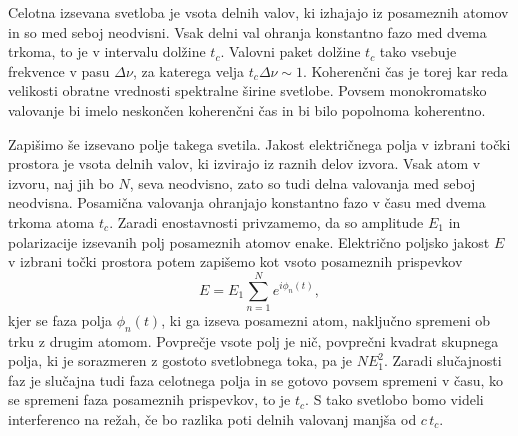Celotna izsevana svetloba je vsota delnih valov, ki izhajajo iz posameznih
atomov in so med seboj neodvisni. Vsak delni val ohranja konstantno fazo
med dvema trkoma, to je v intervalu dolžine $t_{c}$. Valovni paket dolžine 
$t_{c}$ tako vsebuje frekvence v pasu $\Delta \nu$,
za katerega velja $t_{c}\Delta\nu\sim1$. Koherenčni čas je torej
kar reda velikosti obratne vrednosti spektralne širine svetlobe. Povsem
monokromatsko valovanje bi imelo neskončen koherenčni čas in bi bilo
popolnoma koherentno.

Zapišimo še izsevano polje takega svetila. 
Jakost električnega polja v izbrani točki prostora je vsota delnih
valov, ki izvirajo iz raznih delov izvora. Vsak atom v izvoru, naj
jih bo $N$, seva neodvisno, zato so tudi delna valovanja med seboj
neodvisna. Posamična valovanja ohranjajo konstantno fazo v času med
dvema trkoma atoma $t_{c}$. Zaradi enostavnosti privzamemo,
da so amplitude $E_{1}$ in polarizacije izsevanih polj posameznih atomov enake. 
Električno poljsko jakost $E$ v izbrani točki prostora potem 
zapišemo kot vsoto posameznih prispevkov
\begin{equation}
E=E_{1}\sum_{n=1}^{N}e^{i\phi_{n}(t)},
\label{eq:amplituda-random}
\end{equation}
kjer se faza polja $\phi_{n}(t)$, ki ga izseva posamezni atom, naključno
spremeni ob trku z drugim atomom. Povprečje vsote polj je nič, 
povprečni kvadrat skupnega polja, ki je sorazmeren
z gostoto svetlobnega toka, pa je $NE_{1}^{2}$. Zaradi slučajnosti faz je 
slučajna tudi faza celotnega polja in se gotovo povsem spremeni v času, ko se
spremeni faza posameznih prispevkov, to je $t_{c}$. S tako svetlobo bomo videli 
interferenco na režah, če bo razlika poti delnih valovanj manjša od $c\, t_{c}$.

